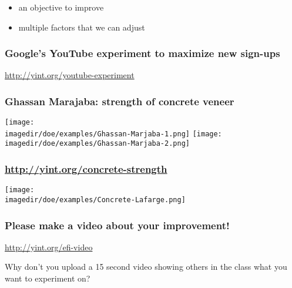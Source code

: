 \begin{frame}\frametitle{}
	\begin{itemize}
		\item	\LARGE an {\color{purple}objective} to improve
		\item	\LARGE multiple {\color{purple}factors} that we can adjust
	\end{itemize}
\end{frame}

\begin{frame}\frametitle{Google's YouTube experiment to maximize new sign-ups}
	\begin{center}
		\Huge{\href{http://yint.org/youtube-experiment}{http://yint.org/youtube-experiment}}
	\end{center}	
\end{frame}

\begin{frame}\frametitle{Ghassan Marajaba: strength of concrete veneer}
	\begin{center}
		\texttt{[image: \\imagedir/doe/examples/Ghassan-Marjaba-1.png]}
		\texttt{[image: \\imagedir/doe/examples/Ghassan-Marjaba-2.png]}
	\end{center}
\end{frame}

\begin{frame}\frametitle{\href{http://yint.org/concrete-strength}{http://yint.org/concrete-strength}}
	\begin{center}
		\texttt{[image: \\imagedir/doe/examples/Concrete-Lafarge.png]}
	\end{center}
\end{frame}

\begin{frame}\frametitle{Please make a video about your improvement!}
	{\Huge \href{http://yint.org/efi-video}{http://yint.org/efi-video}
	
	\vspace{24pt}	
	Why don't you upload a 15 second video showing others in the class what you want to experiment on?	
	}
\end{frame}
